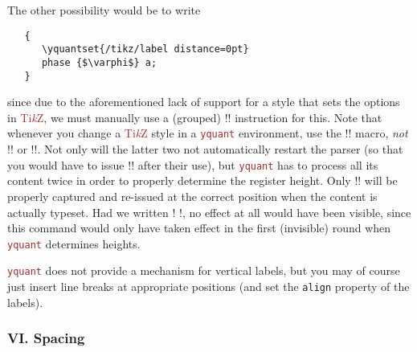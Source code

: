 \documentclass{scrartcl}
\def\TikZ{\textcolor{brown}{Ti\textit kZ}}
\def\pkg#1{\textcolor{brown}{\texttt{#1}}}
\def\Yquant{\pkg{yquant}}
\begin{document}
\begin{example}
               The other possibility would be to write
               \begin{verbatim}
   {
      \yquantset{/tikz/label distance=0pt}
      phase {$\varphi$} a;
   }
               \end{verbatim}
               since due to the aforementioned lack of support for a style that sets the options in \TikZ, we must manually use a (grouped) \tex!\yquantset! instruction for this.
               Note that whenever you change a \TikZ{} style in a \Yquant{} environment, use the \tex!\yquantset! macro, \emph{not} \tex!\tikzset! or \tex!\pgfkeys!.
               Not only will the latter two not automatically restart the parser (so that you would have to issue \tex!\yquant! after their use), but \Yquant{} has to process all its content twice in order to properly determine the register height.
               Only \tex!\yquantset! will be properly captured and re\hyp issued at the correct position when the content is actually typeset.
               Had we written \tex!\tikzset{label distance=0pt} \yquant!, no effect at all would have been visible, since this command would only have taken effect in the first (invisible) round when \Yquant{} determines heights.
            \end{example}

            \Yquant{} does not provide a mechanism for vertical labels, but you may of course just insert line breaks at appropriate positions (and set the \texttt{align} property of the labels).

         \subsubsection{VI. Spacing}
\end{document}
